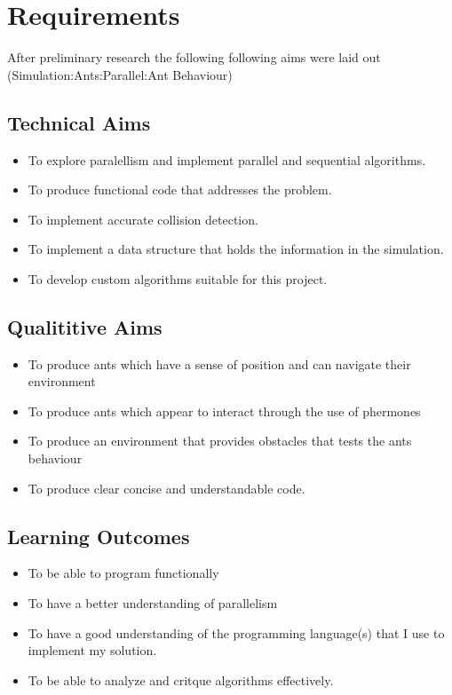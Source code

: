 \documentclass[main.tex]{subfiles}
\begin{document}
\section{Requirements}

After preliminary research the following following aims were laid out (Simulation:Ants:Parallel:Ant Behaviour)

\subsection{Technical Aims}
\begin{itemize}
	\item To explore paralellism and implement parallel and sequential algorithms.
	\item To produce functional code that addresses the problem.
	\item To implement accurate collision detection.
	\item To implement a data structure that holds the information in the simulation.
	\item To develop custom algorithms suitable for this project.
\end{itemize}

\subsection{Qualititive Aims}
\begin{itemize}
	\item To produce ants which have a sense of  position and can navigate their environment
	\item To produce ants which appear to interact through the use of phermones
	\item To produce an environment that provides obstacles that tests the ants behaviour
	\item To produce clear concise and understandable code.
\end{itemize}

\subsection{Learning Outcomes}
\begin{itemize}
	\item To be able to program functionally
	\item To have a better understanding of parallelism
	\item To have a good understanding of the programming language(s) that I use to implement my solution.
	\item To be able to analyze and critque algorithms effectively.
\end{itemize}
\end{document}
